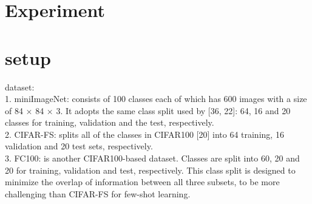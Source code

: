 \documentclass{article}
\begin{document}
\section{Experiment}
\section{setup}
dataset: \\
1. miniImageNet: consists of 100 classes each of which has 600 images with a size of 84 × 84 × 3. It adopts the same class split used by [36, 22]: 64, 16 and 20 classes for training, validation and the test, respectively. \\
2. CIFAR-FS: splits all of the classes in CIFAR100 [20] into 64 training, 16 validation and 20 test sets, respectively. \\
3. FC100: is another CIFAR100-based dataset. Classes are split into 60, 20 and 20 for training, validation and test, respectively. This class split is designed to minimize the overlap of information between all three subsets, to be more challenging than CIFAR-FS for few-shot learning. \\
 
\end{document}
